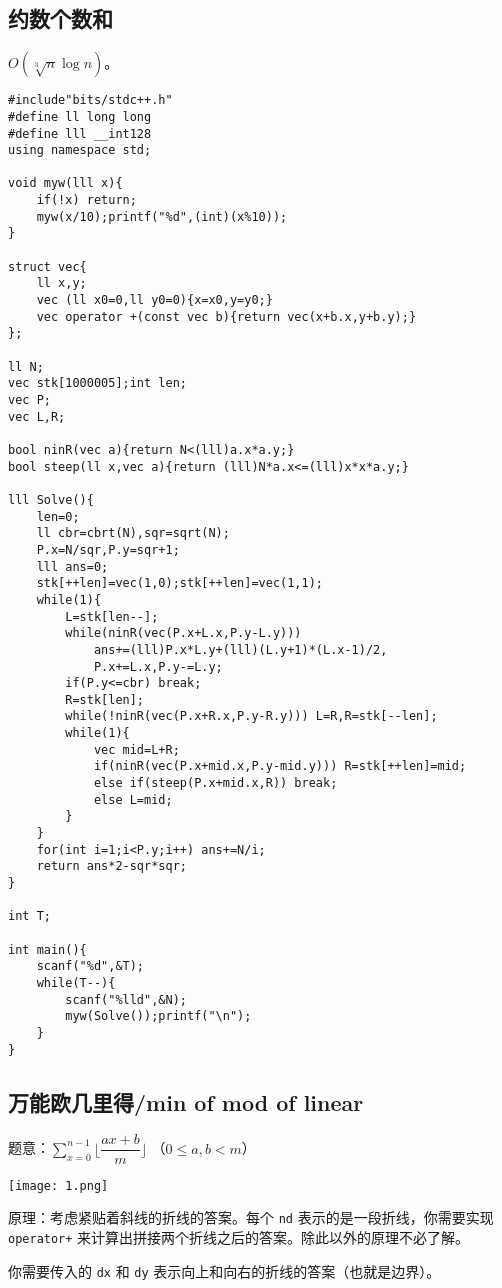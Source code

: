 \documentclass[12pt]{ctexart}
\begin{document}
\subsection{约数个数和}

$O(\sqrt[3]n\log n)$。

\begin{lstlisting}
#include"bits/stdc++.h"
#define ll long long
#define lll __int128
using namespace std;

void myw(lll x){
	if(!x) return;
	myw(x/10);printf("%d",(int)(x%10));
}

struct vec{
	ll x,y;
	vec (ll x0=0,ll y0=0){x=x0,y=y0;}
	vec operator +(const vec b){return vec(x+b.x,y+b.y);}
};

ll N;
vec stk[1000005];int len;
vec P;
vec L,R; 

bool ninR(vec a){return N<(lll)a.x*a.y;}
bool steep(ll x,vec a){return (lll)N*a.x<=(lll)x*x*a.y;}

lll Solve(){
	len=0;
	ll cbr=cbrt(N),sqr=sqrt(N);
	P.x=N/sqr,P.y=sqr+1;
	lll ans=0;
	stk[++len]=vec(1,0);stk[++len]=vec(1,1);
	while(1){
		L=stk[len--];
		while(ninR(vec(P.x+L.x,P.y-L.y)))
			ans+=(lll)P.x*L.y+(lll)(L.y+1)*(L.x-1)/2,
			P.x+=L.x,P.y-=L.y;
		if(P.y<=cbr) break;
		R=stk[len];
		while(!ninR(vec(P.x+R.x,P.y-R.y))) L=R,R=stk[--len];
		while(1){
			vec mid=L+R;
			if(ninR(vec(P.x+mid.x,P.y-mid.y))) R=stk[++len]=mid;
			else if(steep(P.x+mid.x,R)) break;
			else L=mid;
		}
	}
	for(int i=1;i<P.y;i++) ans+=N/i;
	return ans*2-sqr*sqr;
}

int T;

int main(){
	scanf("%d",&T);
	while(T--){
		scanf("%lld",&N);
		myw(Solve());printf("\n");
	}
}
\end{lstlisting}



\subsection{万能欧几里得/min of mod of linear}

题意：$\sum\limits_{x=0}^{n-1}\lfloor \dfrac {ax+b}m\rfloor$ （$0\le a,b<m$）

\texttt{[image: 1.png]}

原理：考虑紧贴着斜线的折线的答案。每个 \verb|nd| 表示的是一段折线，你需要实现 \verb|operator+| 来计算出拼接两个折线之后的答案。除此以外的原理不必了解。

你需要传入的 \verb|dx| 和 \verb|dy| 表示向上和向右的折线的答案（也就是边界）。
\end{document}
